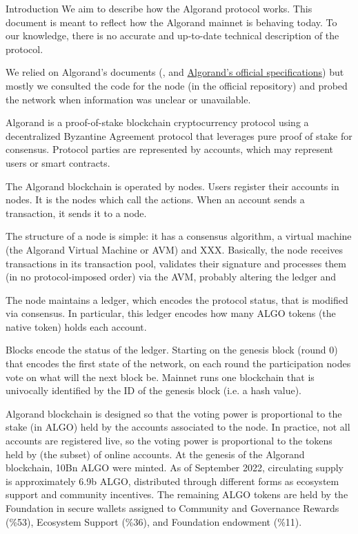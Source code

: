 \documentclass[10pt,a4paper]{article}
\begin{document}
\begin{section}{Introduction}
We aim to describe how the Algorand protocol works. 
This document is meant to reflect how the Algorand mainnet is behaving
today. 
To our knowledge, there is no accurate and up-to-date technical description 
of the protocol. 

We relied on Algorand's documents (\cite{DBLP:conf/sosp/GiladHMVZ17},
\cite{DBLP:journals/corr/Micali16} and
\href{https://github.com/algorandfoundation/specs}{Algorand's official specifications})
but mostly we consulted the code for the node (in the official repository) and probed 
the network when information was unclear or unavailable.

Algorand is a proof-of-stake blockchain cryptocurrency protocol 
using a decentralized By\-zan\-tine Agreement protocol that leverages 
pure proof of stake for consensus. 
Protocol parties are represented by accounts, which may represent users
or smart contracts. 

The Algorand blockchain is operated by nodes. Users register their accounts 
in nodes. It is the nodes which call the actions. 
When an account sends a transaction, it sends it to a node. 

The structure of a node is simple: 
it has a consensus algorithm,
a virtual machine (the Algorand Virtual Machine or AVM) and 
XXX.
Basically, the node receives transactions in its transaction pool,
validates their signature and processes them (in no protocol-imposed order)
via the AVM, probably altering the ledger and 

The node maintains a ledger, which encodes the protocol status,
that is modified via consensus.
In particular, this ledger encodes how many {\sf ALGO tokens} 
(the native token) holds each account.

Blocks encode the status of the ledger. Starting on the genesis
block (round 0) that encodes the first state of the network, 
on each round the participation nodes vote on what will the next
block be. 
Mainnet runs one blockchain that is univocally identified by the ID of
the genesis block (i.e. a hash value).

Algorand blockchain is designed so that the voting power is proportional
to the stake (in {\sf ALGO}) held by the accounts associated to the node.
In practice, not all accounts are registered live, so the voting power
is proportional to the tokens held by (the subset) of online accounts.
At the genesis of the Algorand blockchain, 10Bn {\sf ALGO} were minted. 
As of September 2022, circulating supply is approximately 6.9b {\sf ALGO}, 
distributed through different forms as ecosystem support and community
incentives.
The remaining {\sf ALGO} tokens are held by the Foundation in secure wallets 
assigned to 
Community and Governance Rewards (\%53), 
Ecosystem Support (\%36), and 
Foundation endowment (\%11).


\end{section}
\end{document}
